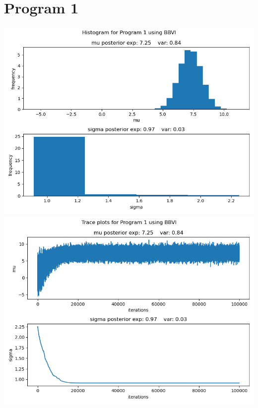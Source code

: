 \documentclass[10pt]{homeworg}
\begin{document}
\section*{Program 1}
\begin{center}
\includegraphics[scale=0.5]{figures/BBVI_program_1.png}
\includegraphics[scale=0.5]{figures/BBVI_program_1_trace.png}
\end{center}
\end{document}
